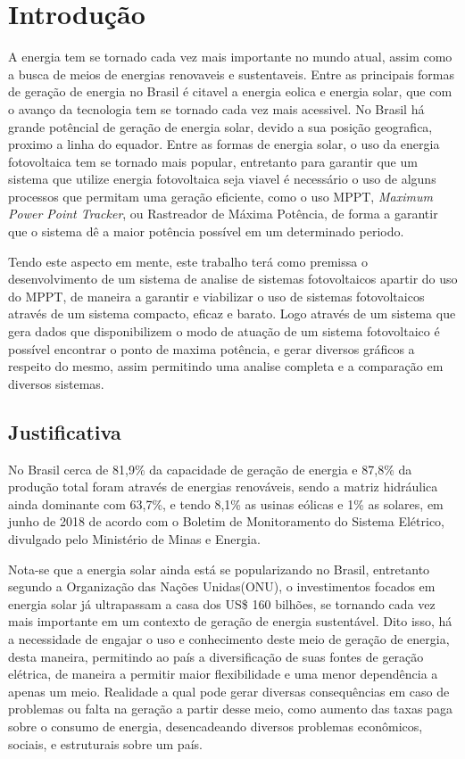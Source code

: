 \chapter{Introdução}
\label{cap:01}
A energia tem se tornado cada vez mais importante no mundo atual, assim como a busca de meios de energias renovaveis e sustentaveis. Entre as principais formas de geração de energia no Brasil é citavel a energia eolica e energia solar, que com o avanço da tecnologia tem se tornado cada vez mais acessivel. No Brasil há grande potêncial de geração de energia solar, devido a sua posição geografica, proximo a linha do equador. Entre as formas de energia solar, o uso da energia fotovoltaica tem se tornado mais popular, entretanto para garantir que um sistema que utilize energia fotovoltaica seja viavel é necessário o uso de alguns processos que permitam uma geração eficiente, como o uso MPPT, \textit{Maximum Power Point Tracker}, ou Rastreador de Máxima Potência, de forma a garantir que o sistema dê a maior potência possível em um determinado periodo.

\indent		Tendo este aspecto em mente, este trabalho terá como premissa o desenvolvimento de um sistema de analise de sistemas fotovoltaicos apartir do uso do MPPT, de maneira a garantir e viabilizar o uso de sistemas fotovoltaicos através de um sistema compacto, eficaz e barato.
Logo através de um sistema que gera dados que disponibilizem o modo de atuação de um sistema fotovoltaico é possível encontrar o ponto de maxima potência, e gerar diversos gráficos a respeito do mesmo, assim permitindo uma analise completa e a comparação em diversos sistemas.


\section{Justificativa}

No Brasil cerca de 81,9\% da capacidade de geração de energia e 87,8\% da produção total foram através de energias renováveis, sendo a matriz hidráulica ainda dominante com 63,7\%, e tendo 8,1\% as usinas eólicas e 1\% as solares, em junho de 2018 de acordo com o Boletim de Monitoramento do Sistema Elétrico, divulgado pelo Ministério de Minas e Energia.

\indent{}	Nota-se que a energia solar ainda está se popularizando no Brasil, entretanto segundo a Organização das Nações Unidas(ONU), o investimentos focados em energia solar já ultrapassam a casa dos US\$ 160 bilhões, se tornando cada vez mais importante em um contexto de geração de energia sustentável. Dito isso, há a necessidade de engajar o uso e conhecimento deste meio de geração de energia, desta maneira, permitindo ao país a diversificação de suas fontes de geração elétrica, de maneira a permitir maior flexibilidade e uma menor dependência a apenas um meio. Realidade a qual pode gerar diversas consequências em caso de problemas ou falta na geração a partir desse meio, como aumento das taxas paga sobre o consumo de energia, desencadeando diversos problemas econômicos, sociais, e estruturais sobre um país.


